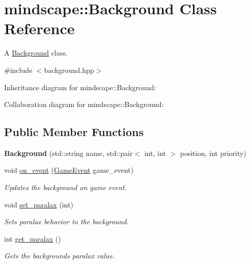 \hypertarget{classmindscape_1_1_background}{}\section{mindscape\+:\+:Background Class Reference}
\label{classmindscape_1_1_background}


A \hyperlink{classmindscape_1_1_background}{Background} class.  




{\ttfamily \#include $<$background.\+hpp$>$}



Inheritance diagram for mindscape\+:\+:Background\+:


Collaboration diagram for mindscape\+:\+:Background\+:
\subsection*{Public Member Functions}
\begin{DoxyCompactItemize}
\item 
{\bfseries Background} (std\+::string name, std\+::pair$<$ int, int $>$ position, int priority)\hypertarget{classmindscape_1_1_background_a73e8e3561ad05c3228b67935376214dc}{}\label{classmindscape_1_1_background_a73e8e3561ad05c3228b67935376214dc}

\item 
void \hyperlink{classmindscape_1_1_background_af931f65e30c28af741c6e512138e6f50}{on\+\_\+event} (\hyperlink{class_game_event}{Game\+Event} game\+\_\+event)
\begin{DoxyCompactList}\small\item\em Updates the background on game event. \end{DoxyCompactList}\item 
void \hyperlink{classmindscape_1_1_background_aa60aa6d28e9a83b334c2be99a10fdcc2}{set\+\_\+paralax} (int)
\begin{DoxyCompactList}\small\item\em Sets paralax behavior to the background. \end{DoxyCompactList}\item 
int \hyperlink{classmindscape_1_1_background_ada0efcfe6ebdb54789a414bd884e696f}{get\+\_\+paralax} ()
\begin{DoxyCompactList}\small\item\em Gets the backgrounds\textquotesingle{} paralax value. \end{DoxyCompactList}\end{DoxyCompactItemize}
